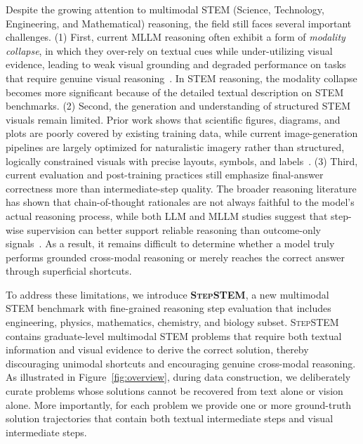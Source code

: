 \documentclass[11pt]{article}
\newcommand{\bench}{{\textsc{StepSTEM}}}
\begin{document}
Despite the growing attention to multimodal STEM (Science, Technology, Engineering, and Mathematical) reasoning, the field still faces several important challenges. (1) First, current MLLM reasoning often exhibit a form of {\it modality collapse}, in which they over-rely on textual cues while under-utilizing visual evidence, leading to weak visual grounding and degraded performance on tasks that require genuine visual reasoning~\cite{DBLP:conf/emnlp/ZhaoSCZSCZ25,DBLP:conf/acl/WuSWH25,yao2025rethinking}. In STEM reasoning, the modality collapse becomes more significant because of the detailed textual description on STEM benchmarks. (2) Second, the generation and understanding of structured STEM visuals remain limited. Prior work shows that scientific figures, diagrams, and plots are poorly covered by existing training data, while current image-generation pipelines are largely optimized for naturalistic imagery rather than structured, logically constrained visuals with precise layouts, symbols, and labels~\cite{DBLP:conf/acl/0039WXWFK024,DBLP:conf/cvpr/Wei0CW0GSYG25}. (3) Third, current evaluation and post-training practices still emphasize final-answer correctness more than intermediate-step quality. The broader reasoning literature has shown that chain-of-thought rationales are not always faithful to the model's actual reasoning process, while both LLM and MLLM studies suggest that step-wise supervision can better support reliable reasoning than outcome-only signals~\cite{DBLP:conf/nips/TurpinMPB23,DBLP:conf/iclr/LightmanKBEBLLS24,zhang2025r1}. As a result, it remains difficult to determine whether a model truly performs grounded cross-modal reasoning or merely reaches the correct answer through superficial shortcuts.

To address these limitations, we introduce \textbf{\bench}, a new multimodal STEM benchmark with fine-grained reasoning step evaluation that includes engineering, physics, mathematics, chemistry, and biology subset. {\bench} contains graduate-level multimodal STEM problems that require both textual information and visual evidence to derive the correct solution, thereby discouraging unimodal shortcuts and encouraging genuine cross-modal reasoning. As illustrated in Figure~\ref{fig:overview}, during data construction, we deliberately curate problems whose solutions cannot be recovered from text alone or vision alone. More importantly, for each problem we provide one or more ground-truth solution trajectories that contain both textual intermediate steps and visual intermediate steps.
\end{document}
